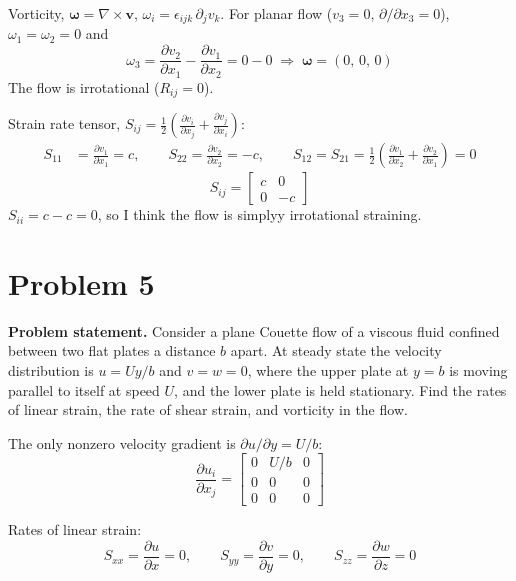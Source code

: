\documentclass[11pt]{article}
\newcommand{\pd}[2]{\frac{\partial #1}{\partial #2}}
\newcommand{\vect}[1]{\mathbf{#1}}
\begin{document}
\noindent Vorticity, $\boldsymbol\omega = \nabla\times\vect v$, $\omega_i = \epsilon_{ijk}\,\partial_j v_k$.
For planar flow ($v_3 = 0$, $\partial/\partial x_3 = 0$), $\omega_1 = \omega_2 = 0$ and
\begin{equation*}
\omega_3 = \pd{v_2}{x_1} - \pd{v_1}{x_2} = 0 - 0
\;\Rightarrow\;
\boxed{\boldsymbol\omega = (0,\,0,\,0)}
\end{equation*}
The flow is irrotational ($R_{ij} = 0$).

\medskip
\noindent Strain rate tensor, $S_{ij} = \tfrac12\left(\pd{v_i}{x_j} + \pd{v_j}{x_i}\right)$:
\begin{align*}
S_{11} &= \pd{v_1}{x_1} = c, \qquad
S_{22} = \pd{v_2}{x_2} = -c, \qquad
S_{12} = S_{21} = \tfrac12\left(\pd{v_1}{x_2} + \pd{v_2}{x_1}\right) = 0
\end{align*}
\begin{equation*}
\boxed{S_{ij} =
\begin{bmatrix}
c & 0 \\
0 & -c
\end{bmatrix}}
\end{equation*}
$S_{ii} = c - c = 0$, so I think the flow is simplyy irrotational straining.

\section*{Problem 5}

\noindent\textbf{Problem statement.} Consider a plane Couette flow of a viscous fluid confined between
two flat plates a distance $b$ apart. At steady state the velocity distribution is $u = Uy/b$ and
$v = w = 0$, where the upper plate at $y = b$ is moving parallel to itself at speed $U$, and the
lower plate is held stationary. Find the rates of linear strain, the rate of shear strain, and
vorticity in the flow.

\medskip
\noindent The only nonzero velocity gradient is $\partial u/\partial y = U/b$:
\begin{equation*}
\pd{u_i}{x_j} =
\begin{bmatrix}
0 & U/b & 0 \\
0 & 0 & 0 \\
0 & 0 & 0
\end{bmatrix}
\end{equation*}

\noindent Rates of linear strain:
\begin{equation*}
\boxed{S_{xx} = \pd{u}{x} = 0, \qquad S_{yy} = \pd{v}{y} = 0, \qquad S_{zz} = \pd{w}{z} = 0}
\end{equation*}
\end{document}
